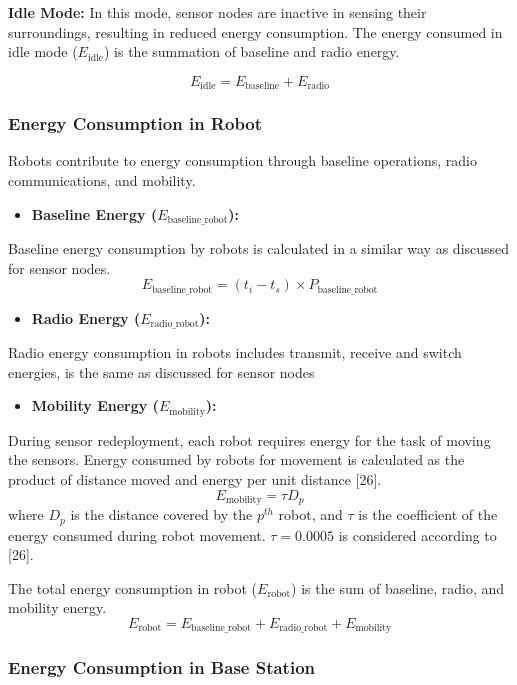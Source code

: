\documentclass{article}
\begin{document}
\noindent\textbf{Idle Mode:} In this mode, sensor nodes are inactive in sensing their surroundings, resulting in reduced energy consumption. The energy consumed in idle mode ($E_{\text{idle}}$) is the summation of baseline and radio energy.

\[
E_{\text{idle}} = E_{\text{baseline}} + E_{\text{radio}}
\]

\subsubsection*{Energy Consumption in Robot}

Robots contribute to energy consumption through baseline operations, radio communications, and mobility.
\begin{itemize}
    \item \textbf{Baseline Energy ($E_{\text{baseline\_robot}}$):}
\end{itemize}
Baseline energy consumption by robots is calculated in a similar way as discussed for sensor nodes.
\[
E_{\text{baseline\_robot}} = (t_i - t_s) \times P_{\text{baseline\_robot}}
\]
\begin{itemize}
    \item \textbf{Radio Energy ($E_{\text{radio\_robot}}$):}
\end{itemize}
Radio energy consumption in robots includes transmit, receive and switch energies, is the same as discussed for sensor nodes
\begin{itemize}
    \item \textbf{Mobility Energy ($E_{\text{mobility}}$):}
\end{itemize}
During sensor redeployment, each robot requires energy for the task of moving the sensors. Energy consumed by robots for movement is calculated as the product of distance moved and energy per unit distance [26].
\[
E_{\text{mobility}} = \tau D_p
\]
where $D_p$ is the distance covered by the $p^{th}$ robot, and $\tau$ is the coefficient of the energy consumed during robot movement. $\tau = 0.0005$ is considered according to [26].

The total energy consumption in robot ($E_{\text{robot}}$) is the sum of baseline, radio, and mobility energy.
\[
E_{\text{robot}} = E_{\text{baseline\_robot}} + E_{\text{radio\_robot}} + E_{\text{mobility}}
\]

\subsubsection*{Energy Consumption in Base Station}
\end{document}
